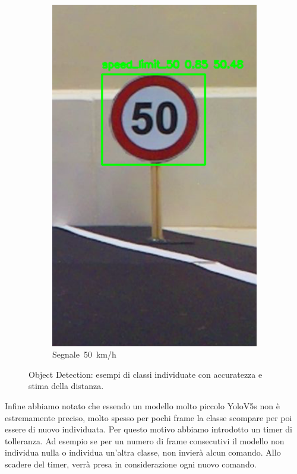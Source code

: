 \documentclass{article}
\begin{document}
\begin{figure}[h!]
\begin{subfigure}[b]{0.3\textwidth}
        \includegraphics[width=\linewidth]{50.png}
        \caption{Segnale 50 km/h} 
        \label{fig:50}
    \end{subfigure}

    \caption{Object Detection: esempi di classi individuate con accuratezza e stima della distanza.}
    \label{fig:object_detection}
\end{figure}



    Infine abbiamo notato che essendo un modello molto piccolo YoloV5s non è estremamente preciso, molto spesso per pochi frame la classe scompare per poi essere di nuovo individuata. Per questo motivo abbiamo introdotto un timer di tolleranza. Ad esempio se per un numero di frame consecutivi il modello non individua nulla o individua un'altra classe, non invierà alcun comando. Allo scadere del timer, verrà presa in considerazione ogni nuovo comando.
    
\end{document}
